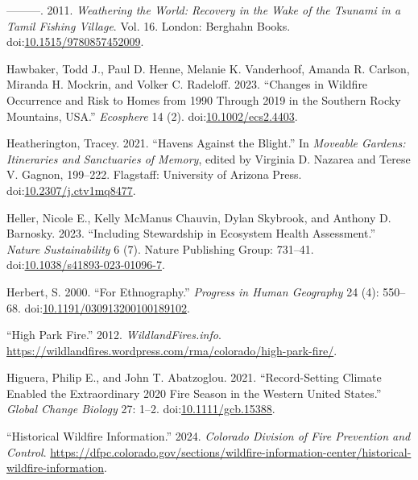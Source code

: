 \documentclass[
]{article}
\newlength{\cslhangindent}
\newenvironment{CSLReferences}[2] %
 {\begin{list}{}{%
  \setlength{\itemindent}{0pt}
  \setlength{\leftmargin}{0pt}
  \setlength{\parsep}{0pt}
  \ifodd #1
   \setlength{\leftmargin}{\cslhangindent}
   \setlength{\itemindent}{-1\cslhangindent}
  \fi
  \setlength{\itemsep}{#2\baselineskip}}}
 {\end{list}}
\begin{document}
\begin{CSLReferences}{1}{0}
---------. 2011. \emph{Weathering the {World}: {Recovery} in the {Wake} of the {Tsunami} in a {Tamil Fishing Village}}. Vol. 16. London: Berghahn Books. doi:\href{https://doi.org/10.1515/9780857452009}{10.1515/9780857452009}.

Hawbaker, Todd J., Paul D. Henne, Melanie K. Vanderhoof, Amanda R. Carlson, Miranda H. Mockrin, and Volker C. Radeloff. 2023. {``Changes in Wildfire Occurrence and Risk to Homes from 1990 Through 2019 in the {Southern Rocky Mountains}, {USA}.''} \emph{Ecosphere} 14 (2). doi:\href{https://doi.org/10.1002/ecs2.4403}{10.1002/ecs2.4403}.

Heatherington, Tracey. 2021. {``Havens Against the {Blight}.''} In \emph{Moveable {Gardens}: {Itineraries} and {Sanctuaries} of {Memory}}, edited by Virginia D. Nazarea and Terese V. Gagnon, 199--222. Flagstaff: University of Arizona Press. doi:\href{https://doi.org/10.2307/j.ctv1mq8477}{10.2307/j.ctv1mq8477}.

Heller, Nicole E., Kelly McManus Chauvin, Dylan Skybrook, and Anthony D. Barnosky. 2023. {``Including Stewardship in Ecosystem Health Assessment.''} \emph{Nature Sustainability} 6 (7). Nature Publishing Group: 731--41. doi:\href{https://doi.org/10.1038/s41893-023-01096-7}{10.1038/s41893-023-01096-7}.

Herbert, S. 2000. {``For Ethnography.''} \emph{Progress in Human Geography} 24 (4): 550--68. doi:\href{https://doi.org/10.1191/030913200100189102}{10.1191/030913200100189102}.

{``High {Park Fire}.''} 2012. \emph{WildlandFires.info}. \url{https://wildlandfires.wordpress.com/rma/colorado/high-park-fire/}.

Higuera, Philip E., and John T. Abatzoglou. 2021. {``Record-Setting Climate Enabled the Extraordinary 2020 Fire Season in the Western {United States}.''} \emph{Global Change Biology} 27: 1--2. doi:\href{https://doi.org/10.1111/gcb.15388}{10.1111/gcb.15388}.

{``Historical {Wildfire Information}.''} 2024. \emph{Colorado Division of Fire Prevention and Control}. \url{https://dfpc.colorado.gov/sections/wildfire-information-center/historical-wildfire-information}.


\end{CSLReferences}
\end{document}
